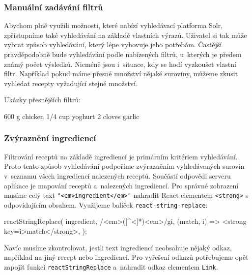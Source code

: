\subsubsection{Manuální zadávání filtrů}

Abychom plně využili možnosti, které nabízí vyhledávací platforma Solr, zpřístupníme také vyhledávání na základě vlastních výrazů. Uživatel si tak může vybrat způsob vyhledávání, který lépe vyhovuje jeho potřebám. Častější pravděpodobně bude vyhledávání podle nabízených filtrů, u~kterých je předem známý počet výsledků. Nicméně jsou i~situace, kdy se hodí vyzkoušet vlastní filtr. Například pokud máme přesné množství nějaké suroviny, můžeme zkusit vyhledat recepty vyžadující stejné množství. 

\begingroup
\samepage
Ukázky přesnějších filtrů:
\begin{code}
600 g chicken
1/4 cup yoghurt
2 cloves garlic
\end{code}
\endgroup

\subsubsection{Zvýraznění ingrediencí}

Filtrování receptů na základě ingrediencí je primárním kritériem vyhledávání. Proto tento způsob vyhledávání podpoříme zvýrazněním vyhledávaných surovin v~seznamu všech ingrediencí nalezených receptů. Součástí odpovědi serveru aplikace je mapování receptů a~nalezených ingrediencí. Pro správné zobrazení musíme celý text \texttt{"}\texttt{<em>ingredient</em>"} nahradit React elementem \texttt{<strong>} s odpovídajícím obsahem. Využijeme balíček \texttt{react-string-replace}:
\begin{code}
reactStringReplace(
  ingredient,
  /<em>([^<]*)<\/em>/gi,
  (match, i) => <strong key={i}>{match}</strong>,
);
\end{code}

Navíc musíme zkontrolovat, jestli text ingrediencí neobsahuje nějaký odkaz, například na jiný recept nebo ingredienci. Pro vyřešení odkazů potřebujeme opět zapojit funkci \texttt{reactStringReplace} a~nahradit odkaz elementem \texttt{Link}.
